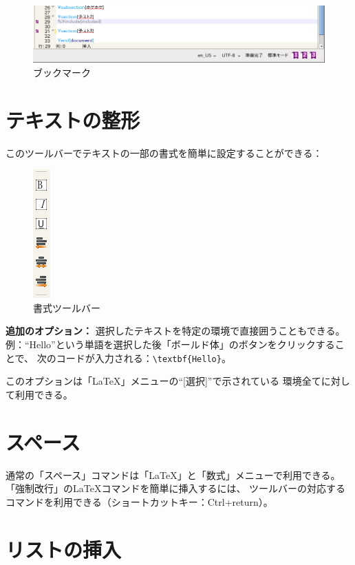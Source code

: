 \begin{figure}[H]
  \centering
  \includegraphics[width=.8\linewidth]{doc20.png}
  \caption{ブックマーク}
\end{figure}

\section{テキストの整形}

このツールバーでテキストの一部の書式を簡単に設定することができる：

\begin{figure}[H]
  \centering
  \includegraphics{doc6.png}
  \caption{書式ツールバー}
\end{figure}

\textbf{追加のオプション：}
選択したテキストを特定の環境で直接囲うこともできる。
例：``Hello''という単語を選択した後「ボールド体」のボタンをクリックすることで、
次のコードが入力される：\verb+\textbf{Hello}+。

このオプションは「LaTeX」メニューの``{[}選択{]}''で示されている
環境全てに対して利用できる。

\section{スペース}

通常の「スペース」コマンドは「LaTeX」と「数式」メニューで利用できる。
「強制改行」のLaTeXコマンドを簡単に挿入するには、
ツールバーの対応するコマンドを利用できる（ショートカットキー：Ctrl+return）。

\section{リストの挿入}

